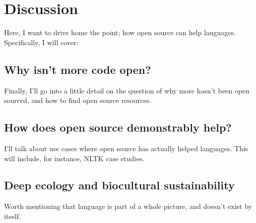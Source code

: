 \section{Discussion}\label{sec:discussion}

Here, I want to drive home the point; how open source can help languages. Specifically, I will cover:

\subsection{Why isn't more code open?}

Finally, I'll go into a little detail on the question of why more hasn't been open sourced, and how to find open source resources.

\subsection{How does open source demonstrably help?}

I'll talk about use cases where open source has actually helped languages. This will include, for instance, NLTK case studies.

\subsection{Deep ecology and biocultural sustainability}

Worth mentioning that language is part of a whole picture, and doesn't exist by itself.


